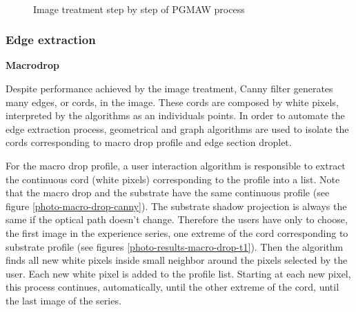 \documentclass[12pt]{iopart}
\begin{document}
\begin{figure}[h!]
\begin{center}
\\
\end{center}
\caption{{\small Image treatment step by step of PGMAW process}}
\label{photo-macro-drop}
\end{figure}


\subsubsection{Edge extraction}
\label{edge_extraction}
\textbf{Macrodrop}

Despite performance achieved by the image treatment, Canny filter
 generates many edges, or cords, in the image. These cords are composed
 by white pixels, interpreted by the algorithms as an individuals points.
 In order to automate the edge extraction process, geometrical and
 graph algorithms are used  to isolate the cords corresponding to
 macro drop profile and edge section droplet.

For the macro drop profile, a user interaction algorithm is responsible
 to extract the continuous cord (white pixels) corresponding
 to the profile into a list. Note  that the macro drop and 
the substrate have the same continuous profile (see figure \ref{photo-macro-drop-canny}).
 The substrate shadow projection is always the same if the optical
 path doesn't change. Therefore the users have only to choose, the
 first image in the experience series, one extreme  of the cord 
corresponding to substrate profile (see figures \ref{photo-results-macro-drop-t1}).
 Then the algorithm finds all new white pixels inside small neighbor around
 the pixels selected by the user. Each new white pixel  is added to the
 profile list. Starting at each new pixel, this process continues,
 automatically, until the other extreme of the cord, until the last
 image of the series.
 
\end{document}
